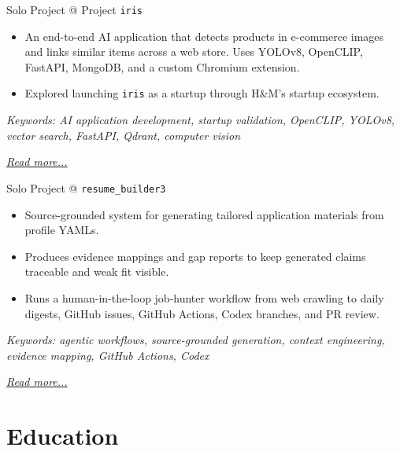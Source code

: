 \documentclass[11pt,a4paper]{moderncv}
\begin{document}
\large{Solo Project @ Project \texttt{iris}}
\normalsize
\begin{itemize}
    \item An end-to-end AI application that detects products in e-commerce images and links similar items across a web store. Uses YOLOv8, OpenCLIP, FastAPI, MongoDB, and a custom Chromium extension.
    \item Explored launching \texttt{iris} as a startup through H\&M's startup ecosystem.
\end{itemize}

{\footnotesize\textit{Keywords: AI application development, startup validation, OpenCLIP, YOLOv8, vector search, FastAPI, Qdrant, computer vision}}

\hfill{\small{\textit{\hyperref[sec:iris]{Read more...}}}}

\large{Solo Project @ \texttt{resume\_builder3}}
\normalsize
\begin{itemize}
    \item Source-grounded system for generating tailored application materials from profile YAMLs.
    \item Produces evidence mappings and gap reports to keep generated claims traceable and weak fit visible.
    \item Runs a human-in-the-loop job-hunter workflow from web crawling to daily digests, GitHub issues, GitHub Actions, Codex branches, and PR review.
\end{itemize}

{\footnotesize\textit{Keywords: agentic workflows, source-grounded generation, context engineering, evidence mapping, GitHub Actions, Codex}}

\hfill{\small{\textit{\hyperref[sec:resume_builder]{Read more...}}}}

\section{Education}
\end{document}
